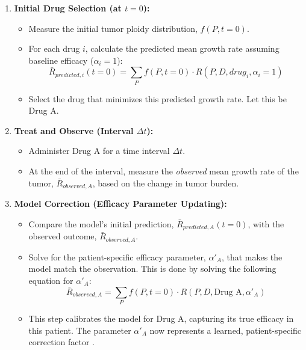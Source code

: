 \documentclass{article}
\begin{document}
\begin{enumerate}
    \item \textbf{Initial Drug Selection (at $t=0$):}
    \begin{itemize}
        \item Measure the initial tumor ploidy distribution, $f(P, t=0)$.
        \item For each drug $i$, calculate the predicted mean growth rate assuming baseline efficacy ($\alpha_i=1$):
        $$ \bar{R}_{predicted, i}(t=0) = \sum_{P} f(P, t=0) \cdot R(P, D, drug_i, \alpha_i=1) $$
        \item Select the drug that minimizes this predicted growth rate. Let this be Drug A.
    \end{itemize}
    
    \item \textbf{Treat and Observe (Interval $\Delta t$):}
    \begin{itemize}
        \item Administer Drug A for a time interval $\Delta t$.
        \item At the end of the interval, measure the \textit{observed} mean growth rate of the tumor, $\bar{R}_{observed, A}$, based on the change in tumor burden.
    \end{itemize}

    \item \textbf{Model Correction (Efficacy Parameter Updating):}
    \begin{itemize}
        \item Compare the model's initial prediction, $\bar{R}_{predicted, A}(t=0)$, with the observed outcome, $\bar{R}_{observed, A}$.
        \item Solve for the patient-specific efficacy parameter, $\alpha'_A$, that makes the model match the observation. This is done by solving the following equation for $\alpha'_A$:
        $$ \bar{R}_{observed, A} = \sum_{P} f(P, t=0) \cdot R(P, D, \text{Drug A}, \alpha'_A) $$
        \item \color{blue} This step calibrates the model for Drug A, capturing its true efficacy in this patient. The parameter $\alpha'_A$ now represents a learned, patient-specific correction factor \color{black}.
    \end{itemize}


\end{enumerate}
\end{document}
